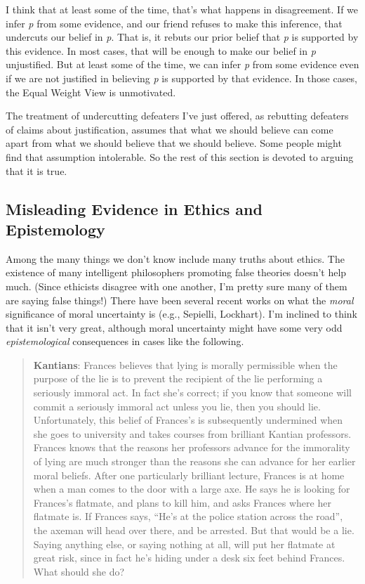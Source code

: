 \documentclass[
  10pt,
  letterpaper,
  DIV=11,
  numbers=noendperiod,
  twoside]{scrartcl}
\begin{document}
I think that at least some of the time, that's what happens in
disagreement. If we infer \emph{p} from some evidence, and our friend
refuses to make this inference, that undercuts our belief in \emph{p}.
That is, it rebuts our prior belief that \emph{p} is supported by this
evidence. In most cases, that will be enough to make our belief in
\emph{p} unjustified. But at least some of the time, we can infer
\emph{p} from some evidence even if we are not justified in believing
\emph{p} is supported by that evidence. In those cases, the Equal Weight
View is unmotivated.

The treatment of undercutting defeaters I've just offered, as rebutting
defeaters of claims about justification, assumes that what we should
believe can come apart from what we should believe that we should
believe. Some people might find that assumption intolerable. So the rest
of this section is devoted to arguing that it is true.

\subsection{Misleading Evidence in Ethics and
Epistemology}\label{misleading-evidence-in-ethics-and-epistemology}

Among the many things we don't know include many truths about ethics.
The existence of many intelligent philosophers promoting false theories
doesn't help much. (Since ethicists disagree with one another, I'm
pretty sure many of them are saying false things!) There have been
several recent works on what the \emph{moral} significance of moral
uncertainty is (e.g., Sepielli, Lockhart). I'm inclined to think that it
isn't very great, although moral uncertainty might have some very odd
\emph{epistemological} consequences in cases like the following.

\begin{quote}
\textbf{Kantians}: Frances believes that lying is morally permissible
when the purpose of the lie is to prevent the recipient of the lie
performing a seriously immoral act. In fact she's correct; if you know
that someone will commit a seriously immoral act unless you lie, then
you should lie. Unfortunately, this belief of Frances's is subsequently
undermined when she goes to university and takes courses from brilliant
Kantian professors. Frances knows that the reasons her professors
advance for the immorality of lying are much stronger than the reasons
she can advance for her earlier moral beliefs. After one particularly
brilliant lecture, Frances is at home when a man comes to the door with
a large axe. He says he is looking for Frances's flatmate, and plans to
kill him, and asks Frances where her flatmate is. If Frances says,
``He's at the police station across the road'', the axeman will head
over there, and be arrested. But that would be a lie. Saying anything
else, or saying nothing at all, will put her flatmate at great risk,
since in fact he's hiding under a desk six feet behind Frances. What
should she do?
\end{quote}
\end{document}
